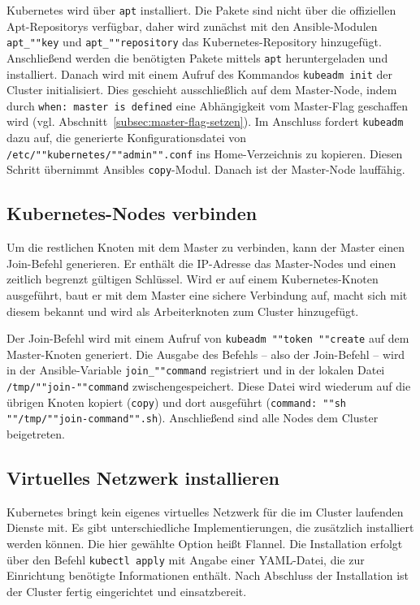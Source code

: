 Kubernetes wird über \texttt{apt} installiert.
Die Pakete sind nicht über die offiziellen Apt-Repositorys verfügbar, daher wird zunächst mit den Ansible-Modulen \texttt{apt\_""key} und \texttt{apt\_""repository} das Kubernetes-Repository hinzugefügt.
Anschließend werden die benötigten Pakete mittels \texttt{apt} heruntergeladen und installiert.
Danach wird mit einem Aufruf des Kommandos \texttt{kubeadm init} der Cluster initialisiert.
Dies geschieht ausschließlich auf dem Master-Node, indem durch \texttt{when: master is defined} eine Abhängigkeit vom Master-Flag geschaffen wird (vgl. Abschnitt~\ref{subsec:master-flag-setzen}).
Im Anschluss fordert \texttt{kubeadm} dazu auf, die generierte Konfigurationsdatei von \texttt{/etc/""kubernetes/""admin"".conf} ins Home-Verzeichnis zu kopieren.
Diesen Schritt übernimmt Ansibles \texttt{copy}-Modul.
Danach ist der Master-Node lauffähig.

\subsection{Kubernetes-Nodes verbinden}\label{subsec:kubernetes-nodes-verbinden}

Um die restlichen Knoten mit dem Master zu verbinden, kann der Master einen Join-Befehl generieren.
Er enthält die IP-Adresse das Master-Nodes und einen zeitlich begrenzt gültigen Schlüssel.
Wird er auf einem Kubernetes-Knoten ausgeführt, baut er mit dem Master eine sichere Verbindung auf, macht sich mit diesem bekannt und wird als Arbeiterknoten zum Cluster hinzugefügt.

Der Join-Befehl wird mit einem Aufruf von \texttt{kubeadm ""token ""create} auf dem Master-Knoten generiert.
Die Ausgabe des Befehls -- also der Join-Befehl -- wird in der Ansible-Variable \texttt{join\_""command} registriert und in der lokalen Datei \texttt{/tmp/""join-""command} zwischengespeichert.
Diese Datei wird wiederum auf die übrigen Knoten kopiert (\texttt{copy}) und dort ausgeführt (\texttt{command: ""sh ""/tmp/""join-command"".sh}).
Anschließend sind alle Nodes dem Cluster beigetreten.

\subsection{Virtuelles Netzwerk installieren}

Kubernetes bringt kein eigenes virtuelles Netzwerk für die im Cluster laufenden Dienste mit.
Es gibt unterschiedliche Implementierungen, die zusätzlich installiert werden können.
Die hier gewählte Option heißt Flannel.
Die Installation erfolgt über den Befehl \texttt{kubectl apply} mit Angabe einer YAML-Datei, die zur Einrichtung benötigte Informationen enthält.
Nach Abschluss der Installation ist der Cluster fertig eingerichtet und einsatzbereit.

